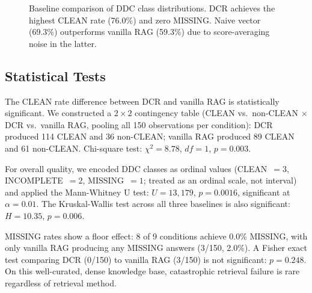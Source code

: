 \documentclass[11pt,a4paper]{article}
\begin{document}
\begin{figure}[t]
\centering
{}
\caption{Baseline comparison of DDC class distributions. DCR achieves the highest CLEAN rate (76.0\%) and zero MISSING. Naive vector (69.3\%) outperforms vanilla RAG (59.3\%) due to score-averaging noise in the latter.}
\label{fig:baselines}
\end{figure}

\subsection{Statistical Tests}

The CLEAN rate difference between DCR and vanilla RAG is statistically significant. We constructed a $2 \times 2$ contingency table (CLEAN vs.\ non-CLEAN $\times$ DCR vs.\ vanilla RAG, pooling all 150 observations per condition): DCR produced 114 CLEAN and 36 non-CLEAN; vanilla RAG produced 89 CLEAN and 61 non-CLEAN. Chi-square test: $\chi^2 = 8.78$, $df = 1$, $p = 0.003$.

For overall quality, we encoded DDC classes as ordinal values (CLEAN~$= 3$, INCOMPLETE~$= 2$, MISSING~$= 1$; treated as an ordinal scale, not interval) and applied the Mann-Whitney U test: $U = 13{,}179$, $p = 0.0016$, significant at $\alpha = 0.01$. The Kruskal-Wallis test across all three baselines is also significant: $H = 10.35$, $p = 0.006$.

MISSING rates show a floor effect: 8 of 9 conditions achieve 0.0\% MISSING, with only vanilla RAG producing any MISSING answers (3/150, 2.0\%). A Fisher exact test comparing DCR (0/150) to vanilla RAG (3/150) is not significant: $p = 0.248$. On this well-curated, dense knowledge base, catastrophic retrieval failure is rare regardless of retrieval method.
\end{document}
